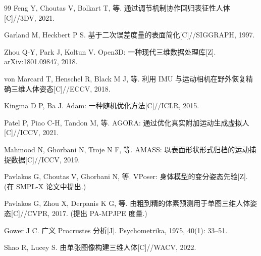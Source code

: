 \documentclass[a4paper,11pt]{article}
\begin{document}
\begin{thebibliography}{99}
Feng Y, Choutas V, Bolkart T, 等. 通过调节机制协作回归表征性人体[C]//3DV, 2021.

Garland M, Heckbert P S. 基于二次误差度量的表面简化[C]//SIGGRAPH, 1997.

Zhou Q-Y, Park J, Koltun V. Open3D: 一种现代三维数据处理库[Z]. arXiv:1801.09847, 2018.

von Marcard T, Henschel R, Black M J, 等. 利用 IMU 与运动相机在野外恢复精确三维人体姿态[C]//ECCV, 2018.

Kingma D P, Ba J. Adam: 一种随机优化方法[C]//ICLR, 2015.

Patel P, Piao C-H, Tandon M, 等. AGORA: 通过优化真实附加运动生成虚拟人[C]//ICCV, 2021.

Mahmood N, Ghorbani N, Troje N F, 等. AMASS: 以表面形状形式归档的运动捕捉数据[C]//ICCV, 2019.

Pavlakos G, Choutas V, Ghorbani N, 等. VPoser: 身体模型的变分姿态先验[Z]. (在 SMPL-X 论文中提出.)

Pavlakos G, Zhou X, Derpanis K G, 等. 由粗到精的体素预测用于单图三维人体姿态[C]//CVPR, 2017. (提出 PA-MPJPE 度量.)

Gower J C. 广义 Procrustes 分析[J]. Psychometrika, 1975, 40(1): 33--51.

Shao R, Lucey S. 由单张图像构建三维人体[C]//WACV, 2022.

\end{thebibliography}
\end{document}
